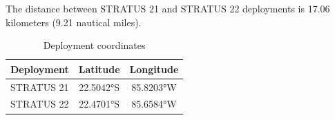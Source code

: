 
The distance between STRATUS 21 and STRATUS 22 deployments is 17.06 kilometers (9.21 nautical miles).

\begin{table}[ht]
\centering
\caption{Deployment coordinates}
\begin{tabular}{lcc}
\hline
\textbf{Deployment} & \textbf{Latitude} & \textbf{Longitude} \\
\hline
STRATUS 21 & 22.5042°S & 85.8203°W \\
STRATUS 22 & 22.4701°S & 85.6584°W \\
\hline
\end{tabular}
\end{table}
